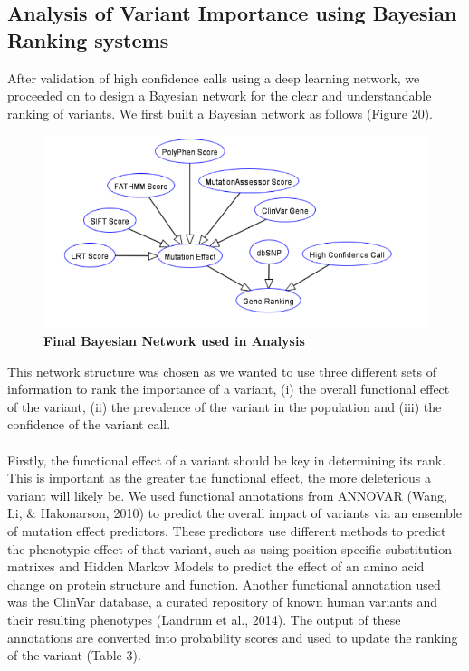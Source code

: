\documentclass{article}
\begin{document}
\subsection{Analysis of Variant Importance using Bayesian Ranking systems}
After validation of high confidence calls using a deep learning network, we proceeded on to design a Bayesian network for the clear and understandable ranking of variants. We first built a Bayesian network as follows (Figure 20). 
\begin{figure}[H]
\includegraphics[width=\textwidth]{bayesiannetwork.png}
\caption{\textbf{Final Bayesian Network used in Analysis}}
\centering
\end{figure}
This network structure was chosen as we wanted to use three different sets of information to rank the importance of a variant, (i) the overall functional effect of the variant, (ii) the prevalence of the variant in the population and (iii) the confidence of the variant call.\\\\ Firstly, the functional effect of a variant should be key in determining its rank. This is important as the greater the functional effect, the more deleterious a variant will likely be. We used functional annotations from ANNOVAR (Wang, Li, \& Hakonarson, 2010) to predict the overall impact of variants via an ensemble of mutation effect predictors.  These predictors use different methods to predict the phenotypic effect of that variant, such as using position-specific substitution matrixes and Hidden Markov Models to predict the effect of an amino acid change on protein structure and function. Another functional annotation used was the ClinVar database, a curated repository of known human variants and their resulting phenotypes (Landrum et al., 2014). The output of these annotations are converted into probability scores and used to update the ranking of the variant (Table 3). 
\end{document}
